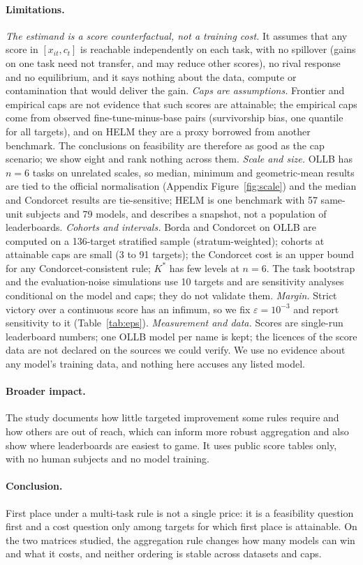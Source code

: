 \paragraph{Limitations.}
\emph{The estimand is a score counterfactual, not a training cost.}
It assumes that any score in $[x_{it},c_t]$ is reachable independently on each task, with no spillover (gains on one task need not transfer, and may reduce other scores), no rival response and no equilibrium, and it says nothing about the data, compute or contamination that would deliver the gain.
\emph{Caps are assumptions.}
Frontier and empirical caps are not evidence that such scores are attainable; the empirical caps come from observed fine-tune-minus-base pairs (survivorship bias, one quantile for all targets), and on HELM they are a proxy borrowed from another benchmark.
The conclusions on feasibility are therefore as good as the cap scenario; we show eight and rank nothing across them.
\emph{Scale and size.}
OLLB has $n=6$ tasks on unrelated scales, so median, minimum and geometric-mean results are tied to the official normalisation (Appendix Figure~\ref{fig:scale}) and the median and Condorcet results are tie-sensitive; HELM is one benchmark with 57 same-unit subjects and 79 models, and describes a snapshot, not a population of leaderboards.
\emph{Cohorts and intervals.}
Borda and Condorcet on OLLB are computed on a 136-target stratified sample (stratum-weighted); cohorts at attainable caps are small (3 to 91 targets); the Condorcet cost is an upper bound for any Condorcet-consistent rule; $K^\ast$ has few levels at $n=6$.
The task bootstrap and the evaluation-noise simulations use 10 targets and are sensitivity analyses conditional on the model and caps; they do not validate them.
\emph{Margin.}
Strict victory over a continuous score has an infimum, so we fix $\varepsilon=10^{-3}$ and report sensitivity to it (Table~\ref{tab:eps}).
\emph{Measurement and data.}
Scores are single-run leaderboard numbers; one OLLB model per name is kept; the licences of the score data are not declared on the sources we could verify.
We use no evidence about any model's training data, and nothing here accuses any listed model.

\paragraph{Broader impact.}
The study documents how little targeted improvement some rules require and how others are out of reach, which can inform more robust aggregation and also show where leaderboards are easiest to game.
It uses public score tables only, with no human subjects and no model training.

\paragraph{Conclusion.}
First place under a multi-task rule is not a single price: it is a feasibility question first and a cost question only among targets for which first place is attainable.
On the two matrices studied, the aggregation rule changes how many models can win and what it costs, and neither ordering is stable across datasets and caps.
